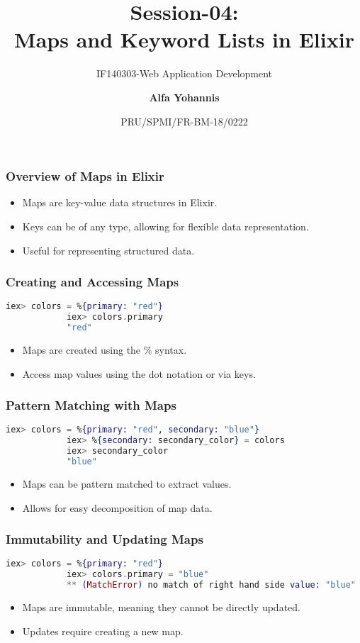\documentclass[aspectratio=169, table]{beamer}
\subtitle{IF140303-Web Application Development}
\title{\LARGE{Session-04:\\ Maps and Keyword Lists in Elixir}
	\vspace{20pt}}
\date[Serial]{\scriptsize {PRU/SPMI/FR-BM-18/0222}}
\author[Pradita]{\small{\textbf{Alfa Yohannis}}}
\begin{document}
	
	\frame{\titlepage}
	
	\begin{frame}
		\frametitle{Overview of Maps in Elixir}
		\begin{itemize}
			\item Maps are key-value data structures in Elixir.
			\item Keys can be of any type, allowing for flexible data representation.
			\item Useful for representing structured data.
		\end{itemize}
	\end{frame}
	
	\begin{frame}[fragile]
		\frametitle{Creating and Accessing Maps}
		\begin{lstlisting}[language=Elixir]
			iex> colors = %{primary: "red"}
			iex> colors.primary
			"red"
		\end{lstlisting}
		\begin{itemize}
			\item Maps are created using the \%{} syntax.
			\item Access map values using the dot notation or via keys.
		\end{itemize}
	\end{frame}
	
	\begin{frame}[fragile]
		\frametitle{Pattern Matching with Maps}
		\begin{lstlisting}[language=Elixir]
			iex> colors = %{primary: "red", secondary: "blue"}
			iex> %{secondary: secondary_color} = colors
			iex> secondary_color
			"blue"
		\end{lstlisting}
		\begin{itemize}
			\item Maps can be pattern matched to extract values.
			\item Allows for easy decomposition of map data.
		\end{itemize}
	\end{frame}
	
	\begin{frame}[fragile]
		\frametitle{Immutability and Updating Maps}
		\begin{lstlisting}[language=Elixir]
			iex> colors = %{primary: "red"}
			iex> colors.primary = "blue"
			** (MatchError) no match of right hand side value: "blue"
		\end{lstlisting}
		\begin{itemize}
			\item Maps are immutable, meaning they cannot be directly updated.
			\item Updates require creating a new map.
		\end{itemize}
	\end{frame}
	
\end{document}
